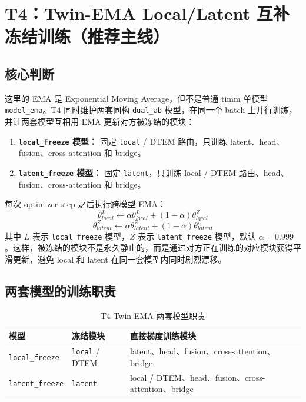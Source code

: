 \documentclass[a4paper,11pt]{article}
\begin{document}
\section{T4：Twin-EMA Local/Latent 互补冻结训练（推荐主线）}

\subsection{核心判断}

这里的 EMA 是 Exponential Moving Average，但不是普通 timm 单模型 \texttt{model\_ema}。T4 同时维护两套同构 \texttt{dual\_ab} 模型，在同一个 batch 上并行训练，并让两套模型互相用 EMA 更新对方被冻结的模块：

\begin{enumerate}
    \item \textbf{\texttt{local\_freeze} 模型：} 固定 \texttt{local} / DTEM 路由，只训练 latent、head、fusion、cross-attention 和 bridge。
    \item \textbf{\texttt{latent\_freeze} 模型：} 固定 \texttt{latent}，只训练 local / DTEM 路由、head、fusion、cross-attention 和 bridge。
\end{enumerate}

每次 optimizer step 之后执行跨模型 EMA：
\[
    \theta^{L}_{local} \leftarrow
    \alpha \theta^{L}_{local} + (1-\alpha)\theta^{Z}_{local}
\]
\[
    \theta^{Z}_{latent} \leftarrow
    \alpha \theta^{Z}_{latent} + (1-\alpha)\theta^{L}_{latent}
\]
其中 $L$ 表示 \texttt{local\_freeze} 模型，$Z$ 表示 \texttt{latent\_freeze} 模型，默认 $\alpha=0.999$。这样，被冻结的模块不是永久静止的，而是通过对方正在训练的对应模块获得平滑更新，避免 local 和 latent 在同一套模型内同时剧烈漂移。

\subsection{两套模型的训练职责}

\begin{table}[h]
\centering
\caption{T4 Twin-EMA 两套模型职责}
\begin{tabular}{l l l}
\toprule
\textbf{模型} & \textbf{冻结模块} & \textbf{直接梯度训练模块} \\
\midrule
\texttt{local\_freeze} & \texttt{local} / DTEM & latent、head、fusion、cross-attention、bridge \\
\texttt{latent\_freeze} & \texttt{latent} & local / DTEM、head、fusion、cross-attention、bridge \\
\bottomrule
\end{tabular}
\end{table}
\end{document}
